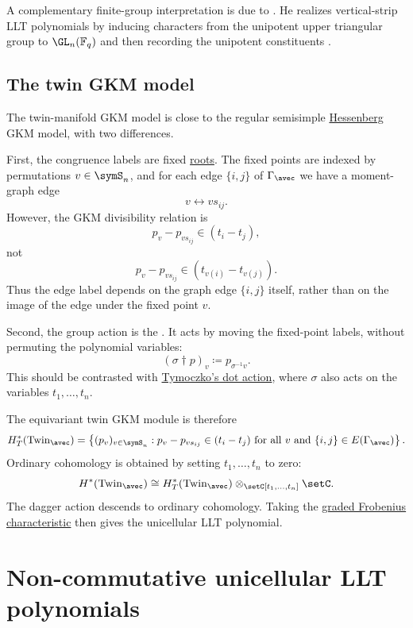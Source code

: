 A complementary finite-group interpretation is due to .
He realizes vertical-strip LLT polynomials by inducing characters from the
unipotent upper triangular group to $\GL_n(\mathbb{F}_q)$ and then recording
the unipotent constituents \cite[Thm.~5.1]{Gagnon2024}.


\subsection[unicellularLLTTwinGKM]{The twin GKM model}

The twin-manifold GKM model is close to the regular semisimple
\hyperref[hessenbergVarieties]{Hessenberg} GKM model, with two differences.

First, the congruence labels are fixed \hyperref[rootSystem]{roots}.
The fixed points are indexed by permutations $v\in\symS_n$, and for each edge $\{i,j\}$ of
$\Gamma_\avec$ we have a moment-graph edge
\[
v\longleftrightarrow v s_{ij}.
\]
However, the GKM divisibility relation is
\[
p_v-p_{v s_{ij}}\in (t_i-t_j),
\]
not
\[
p_v-p_{v s_{ij}}\in (t_{v(i)}-t_{v(j)}).
\]
Thus the edge label depends on the graph edge $\{i,j\}$ itself, rather than
on the image of the edge under the fixed point $v$.

Second, the group action is the \label{daggerAction}.
It acts by moving the fixed-point labels, without permuting the polynomial variables:
\[
(\sigma\dagger p)_v
\coloneqq
p_{\sigma^{-1}v}.
\]
This should be contrasted with \hyperref[tymoczkoDotAction]{Tymoczko's dot
action}, where $\sigma$ also acts on the variables $t_1,\dotsc,t_n$.

The equivariant twin GKM module is therefore
\[
H_T^\ast(\mathrm{Twin}_\avec)
=
\left\{
(p_v)_{v\in\symS_n}
:
p_v-p_{v s_{ij}}\in (t_i-t_j)
\text{ for all } v \text{ and } \{i,j\}\in E(\Gamma_\avec)
\right\}.
\]
Ordinary cohomology is obtained by setting $t_1,\dotsc,t_n$ to zero:
\[
H^\ast(\mathrm{Twin}_\avec)
\cong
H_T^\ast(\mathrm{Twin}_\avec)
\otimes_{\setC[t_1,\dotsc,t_n]}\setC.
\]
The dagger action descends to ordinary cohomology.
Taking the \hyperref[frobeniusCharacteristic]{graded Frobenius characteristic}
then gives the unicellular LLT polynomial.


\section[unicellularLLTNonCom]{Non-commutative unicellular LLT polynomials}

